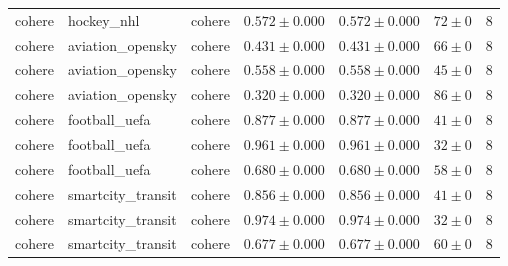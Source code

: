 \begin{table}[htbp]
\begin{tabular}{l l l r r r r}
cohere & hockey\_nhl & cohere & $0.572\pm0.000$ & $0.572\pm0.000$ & $72\pm0$ & 8 \\
cohere & aviation\_opensky & cohere & $0.431\pm0.000$ & $0.431\pm0.000$ & $66\pm0$ & 8 \\
cohere & aviation\_opensky & cohere & $0.558\pm0.000$ & $0.558\pm0.000$ & $45\pm0$ & 8 \\
cohere & aviation\_opensky & cohere & $0.320\pm0.000$ & $0.320\pm0.000$ & $86\pm0$ & 8 \\
cohere & football\_uefa & cohere & $0.877\pm0.000$ & $0.877\pm0.000$ & $41\pm0$ & 8 \\
cohere & football\_uefa & cohere & $0.961\pm0.000$ & $0.961\pm0.000$ & $32\pm0$ & 8 \\
cohere & football\_uefa & cohere & $0.680\pm0.000$ & $0.680\pm0.000$ & $58\pm0$ & 8 \\
cohere & smartcity\_transit & cohere & $0.856\pm0.000$ & $0.856\pm0.000$ & $41\pm0$ & 8 \\
cohere & smartcity\_transit & cohere & $0.974\pm0.000$ & $0.974\pm0.000$ & $32\pm0$ & 8 \\
cohere & smartcity\_transit & cohere & $0.677\pm0.000$ & $0.677\pm0.000$ & $60\pm0$ & 8 \\
\hline
\end{tabular}
\end{table}
